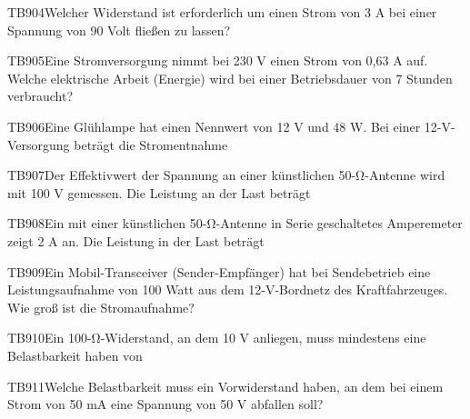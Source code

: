 \begin{question}{TB904}{Welcher Widerstand ist erforderlich um einen Strom von 3 A bei einer Spannung von 90 Volt fließen zu lassen?}
\end{question}

\begin{question}{TB905}{Eine Stromversorgung nimmt bei 230 V einen Strom von 0,63 A auf. Welche elektrische Arbeit (Energie) wird bei einer Betriebsdauer von 7 Stunden verbraucht?}
\end{question}

\begin{question}{TB906}{Eine Glühlampe hat einen Nennwert von 12 V und 48 W. Bei einer 12-V-Versorgung beträgt die Stromentnahme}
\end{question}

\begin{question}{TB907}{Der Effektivwert der Spannung an einer künstlichen 50-Ω-Antenne wird mit 100 V gemessen. Die Leistung an der Last beträgt}
\end{question}

\begin{question}{TB908}{Ein mit einer künstlichen 50-Ω-Antenne in Serie geschaltetes Amperemeter zeigt 2 A an. Die Leistung in der Last beträgt}
\end{question}

\begin{question}{TB909}{Ein Mobil-Transceiver (Sender-Empfänger) hat bei Sendebetrieb eine Leistungsaufnahme von 100 Watt aus dem 12-V-Bordnetz des Kraftfahrzeuges. Wie groß ist die Stromaufnahme?}
\end{question}

\begin{question}{TB910}{Ein 100-Ω-Widerstand, an dem 10 V anliegen, muss mindestens eine Belastbarkeit haben von}
\end{question}

\begin{question}{TB911}{Welche Belastbarkeit muss ein Vorwiderstand haben, an dem bei einem Strom von 50 mA eine Spannung von 50 V abfallen soll?}
\end{question}

